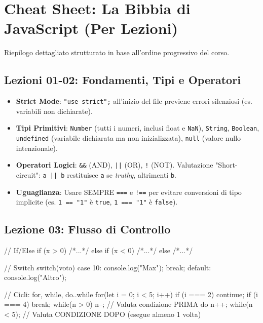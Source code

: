 \documentclass[a4paper,10pt]{article}
\begin{document}
\section{Cheat Sheet: La Bibbia di JavaScript (Per Lezioni)}
Riepilogo dettagliato strutturato in base all'ordine progressivo del corso.

\subsection{Lezioni 01-02: Fondamenti, Tipi e Operatori}
\begin{itemize}
    \item \textbf{Strict Mode}: \texttt{"use strict";} all'inizio del file previene errori silenziosi (es. variabili non dichiarate).
    \item \textbf{Tipi Primitivi}: \texttt{Number} (tutti i numeri, inclusi float e \texttt{NaN}), \texttt{String}, \texttt{Boolean}, \texttt{undefined} (variabile dichiarata ma non inizializzata), \texttt{null} (valore nullo intenzionale).
    \item \textbf{Operatori Logici}: \texttt{\&\&} (AND), \texttt{||} (OR), \texttt{!} (NOT). Valutazione "Short-circuit": \texttt{a || b} restituisce \texttt{a} se \textit{truthy}, altrimenti \texttt{b}.
    \item \textbf{Uguaglianza}: Usare SEMPRE \texttt{===} e \texttt{!==} per evitare conversioni di tipo implicite (es. \texttt{1 == "1"} è \texttt{true}, \texttt{1 === "1"} è \texttt{false}).
\end{itemize}

\subsection{Lezione 03: Flusso di Controllo}
\begin{jsbox}[title={Snippet: If, Switch e Cicli}]
// If/Else
if (x > 0) { /*...*/ } else if (x < 0) { /*...*/ } else { /*...*/ }

// Switch
switch(voto) { 
    case 10: console.log("Max"); break; 
    default: console.log("Altro"); 
}

// Cicli: for, while, do..while
for(let i = 0; i < 5; i++) { if (i === 2) continue; if (i === 4) break; }
while(n > 0) { n--; } // Valuta condizione PRIMA
do { n++; } while(n < 5); // Valuta CONDIZIONE DOPO (esegue almeno 1 volta)
\end{jsbox}
\end{document}
